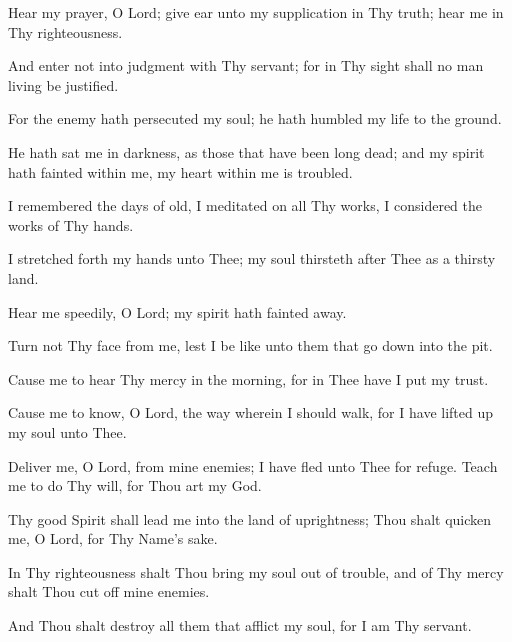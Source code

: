 Hear my prayer, O Lord; give ear unto my supplication in Thy truth; hear me in Thy righteousness.

And enter not into judgment with Thy servant; for in Thy sight shall no man living be justified.

For the enemy hath persecuted my soul; he hath humbled my life to the ground.

He hath sat me in darkness, as those that have been long dead; and my spirit hath fainted within me, my heart within me is troubled.

I remembered the days of old, I meditated on all Thy works, I considered the works of Thy hands.

I stretched forth my hands unto Thee; my soul thirsteth after Thee as a thirsty land.

Hear me speedily, O Lord; my spirit hath fainted away.

Turn not Thy face from me, lest I be like unto them that go down into the pit.

Cause me to hear Thy mercy in the morning, for in Thee have I put my trust.

Cause me to know, O Lord, the way wherein I should walk, for I have lifted up my soul unto Thee.

Deliver me, O Lord, from mine enemies; I have fled unto Thee for refuge. Teach me to do Thy will, for Thou art my God.

Thy good Spirit shall lead me into the land of uprightness; Thou shalt quicken me, O Lord, for Thy Name’s sake.

In Thy righteousness shalt Thou bring my soul out of trouble, and of Thy mercy shalt Thou cut off mine enemies.

And Thou shalt destroy all them that afflict my soul, for I am Thy servant.
